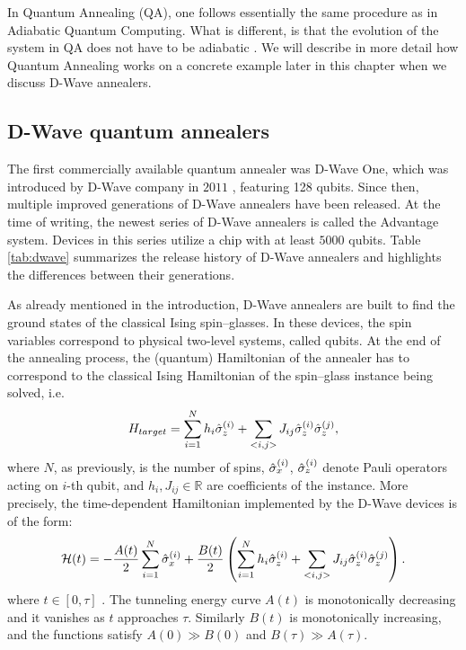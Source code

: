 In Quantum Annealing (QA), one follows essentially the same procedure as in
Adiabatic Quantum Computing. What is different, is that the evolution of the
system in QA does not have to be adiabatic \cite{Vinci2017}. We will describe
in more detail how Quantum Annealing works on a concrete example later in this
chapter when we discuss D-Wave annealers.

\subsection{D-Wave quantum annealers}

The first commercially available quantum annealer was D-Wave One, which was
introduced by D-Wave company in $2011$ \cite{johnson}, featuring 128 qubits.
Since then, multiple improved generations of D-Wave annealers have been
released. At the time of writing, the newest series of D-Wave annealers is
called the Advantage system. Devices in this series utilize a chip with at
least $5000$ qubits. Table \ref{tab:dwave} summarizes the release history of
D-Wave annealers and highlights the differences between their generations.

As already mentioned in the introduction, D-Wave annealers are built to find
the ground states of the classical Ising spin--glasses. In these devices, the
spin variables correspond to physical two-level systems, called qubits. At the
end of the annealing process, the (quantum) Hamiltonian of the annealer has to
correspond to the classical Ising Hamiltonian of the spin--glass instance being
solved, i.e.
\begin{equation}
  H_{target} = \sum_{i=1}^N h_i \hat{\sigma}^{(i)}_z + \sum_{<i, j>} J_{ij} \hat{\sigma}^{(i)}_z \hat{\sigma}^{(j)}_z,
\end{equation}
where $N$, as previously, is the number of spins, $\hat{\sigma}^{(i)}_x$,
$\hat{\sigma}^{(i)}_z$ denote Pauli operators acting on $i$-th qubit, and $h_i,
  J_{ij} \in \mathbb{R}$ are coefficients of the instance. More precisely, the
time-dependent Hamiltonian implemented by the D-Wave devices is of the form:
\begin{equation}
  \label{eq:dwaveham}
  \mathcal{H}(t) =  -\frac{A(t)}{2}\sum_{i=1}^N \hat{\sigma}^{(i)}_x + \frac{B(t)}{2}\left(\sum_{i=1}^N h_i \hat{\sigma}^{(i)}_z + \sum_{<i, j>} J_{ij} \hat{\sigma}^{(i)}_z \hat{\sigma}^{(j)}_z\right).
\end{equation}
where $t \in [0, \tau]$ \cite{dwavedocs}. The tunneling energy curve $A(t)$ is
monotonically decreasing and it vanishes as $t$ approaches $\tau$. Similarly
$B(t)$ is monotonically increasing, and the functions satisfy $A(0) \gg B(0)$
and $B(\tau) \gg A(\tau)$.

